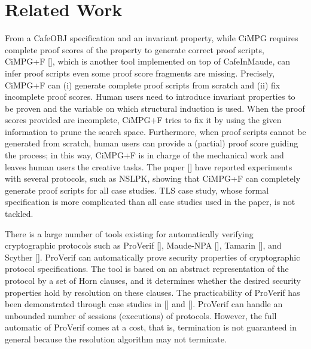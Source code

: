 \documentclass[a4paper,fleqn]{cas-dc}
\begin{document}
\section{Related Work}\label{relatedwork}
From a CafeOBJ specification and an invariant property,
while CiMPG requires complete proof scores of the property to generate correct proof scripts,
CiMPG+F [\cite{Riesco20}], which is another tool implemented on top of CafeInMaude,
can infer proof scripts even some proof score fragments are missing.
Precisely, CiMPG+F can (i) generate complete proof scripts from scratch and (ii) fix incomplete proof scores.
Human users need to introduce invariant properties to be proven and the variable on which structural induction is used.
When the proof scores provided are incomplete, CiMPG+F tries to fix it by using the given information to prune the search space.
Furthermore, when proof scripts cannot be generated from scratch, human users can provide a (partial) proof score guiding the process; in this way, CiMPG+F is in charge of the mechanical work and leaves human users the creative tasks.
The paper [\cite{Riesco20}] have reported experiments with several protocols, such as NSLPK, showing that CiMPG+F can completely generate proof scripts for all case studies.
TLS case study, whose formal specification is more complicated than all case studies used in the paper, is not tackled.


There is a large number of tools existing for automatically verifying cryptographic protocols such as ProVerif [\cite{proverif}], Maude-NPA [\cite{maudenpa}], Tamarin [\cite{tamarin}], and Scyther [\cite{Scyther08}].
ProVerif can automatically prove security properties of cryptographic protocol specifications.
The tool is based on an abstract representation of the protocol by a set of Horn clauses,
and it determines whether the desired security properties hold by resolution on these clauses.
The practicability of ProVerif has been demonstrated through case studies in [\cite{proverif2}] and [\cite{proverif3}]. 
ProVerif can handle an unbounded number of sessions (executions) of protocols. 
However, the full automatic of ProVerif comes at a cost, that is, termination is not guaranteed in general because the resolution algorithm may not terminate. 
\end{document}
